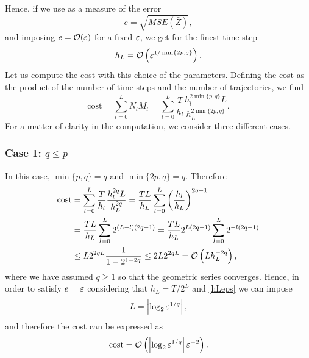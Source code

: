 Hence, if we use as a measure of the error
\begin{equation}
	e = \sqrt{MSE\left(\bar Z \right)},
\end{equation}
and imposing $e = \mathcal{O}(\varepsilon)$ for a fixed $\varepsilon$, we get for the finest time step
\begin{equation} \label{hLeps}
	h_L = \mathcal{O}\left(\varepsilon^{1/\min\{2p, q\}}\right).
\end{equation}
Let us compute the cost with this choice of the parameters. Defining the cost as the product of the number of time steps and the number of trajectories, we find
\begin{equation}
	\mathrm{cost} = \sum_{l=0}^L N_l M_l = \sum_{l=0}^L \frac{T}{h_l} \frac{h_l^{2\min\{p,q\}}L}{h_L^{2\min\{2p, q\}}}.
\end{equation}
For a matter of clarity in the computation, we consider three different cases. 

\subsubsection*{Case 1: $q \leq p$}
In this case, $\min\{p, q\} = q$ and $\min\{2p, q\} = q$. Therefore
\begin{equation}
\begin{aligned}
	\mathrm{cost} &=  \sum_{l=0}^L \frac{T}{h_l} \frac{h_l^{2q}L}{h_L^{2q}} = \frac{TL}{h_L} \sum_{l=0}^L \left(\frac{h_l}{h_L}\right)^{2q-1} \\
	&= \frac{TL}{h_L} \sum_{l=0}^L 2^{(L-l)(2q-1)} = \frac{TL}{h_L} 2^{L(2q-1)} \sum_{l=0}^L 2^{-l(2q-1)} \\
	&\leq L2^{2qL}\frac{1}{1 - 2^{1-2q}} \leq 2 L 2^{2qL} = \mathcal{O}\left(L h_L^{-2q}\right),
\end{aligned}
\end{equation}
where we have assumed $q \geq 1$ so that the geometric series converges. Hence, in order to satisfy $e = \varepsilon$ considering that $h_L = T / 2^L$ and \eqref{hLeps} we can impose
\begin{equation}\label{LCaseOne}
	L = \left|\log_2\varepsilon^{1/q}\right|,
\end{equation} 
and therefore the cost can be expressed as 
\begin{equation}
	\mathrm{cost} = \mathcal{O}\left(\left|\log_2 \varepsilon^{1/q}\right| \varepsilon^{-2}\right).
\end{equation}

